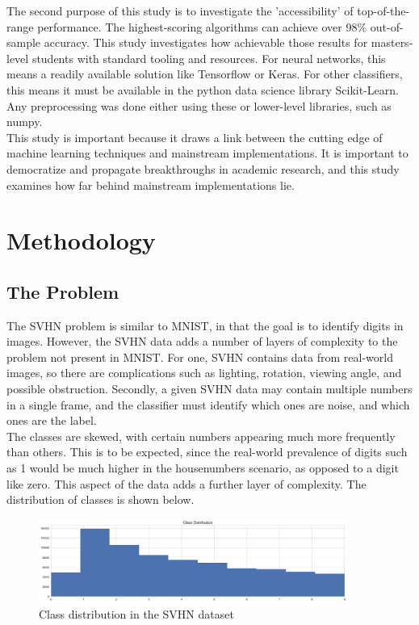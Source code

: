 \documentclass[12pt]{article}
\begin{document}
The second purpose of this study is to investigate the 'accessibility' of top-of-the-range performance. The highest-scoring algorithms can achieve over 98\% out-of-sample accuracy. This study investigates how achievable those results for masters-level students with standard tooling and resources. For neural networks, this means a readily available solution like Tensorflow or Keras. For other classifiers, this means it must be available in the python data science library Scikit-Learn. Any preprocessing was done either using these or lower-level libraries, such as numpy.\\

This study is important because it draws a link between the cutting edge of machine learning techniques and mainstream implementations. It is important to democratize and propagate breakthroughs in academic research, and this study examines how far behind mainstream implementations lie.\\

\section{Methodology}

\subsection{The Problem}
The SVHN problem is similar to MNIST, in that the goal is to identify digits in images. However, the SVHN data adds a number of layers of complexity to the problem not present in MNIST. For one, SVHN contains data from real-world images, so there are complications such as lighting, rotation, viewing angle, and possible obstruction. Secondly, a given SVHN data may contain multiple numbers in a single frame, and the classifier must identify which ones are noise, and which ones are the label.\\

The classes are skewed, with certain numbers appearing much more frequently than others. This is to be expected, since the real-world prevalence of digits such as 1 would be much higher in the housenumbers scenario, as opposed to a digit like zero. This aspect of the data adds a further layer of complexity. The distribution of classes is shown below.\\
\begin{figure}[h]
\caption{Class distribution in the SVHN dataset}
\centering
\includegraphics[width=0.9\textwidth]{images/svhn_classes.png}
\end{figure}
\end{document}
